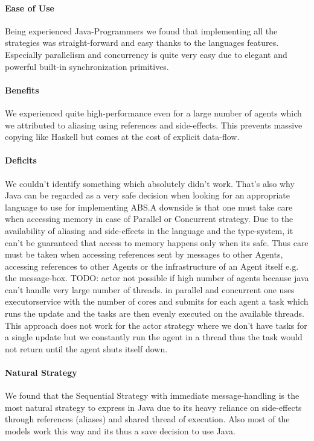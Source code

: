 \paragraph{Ease of Use}
Being experienced Java-Programmers we found that implementing all the strategies was straight-forward and easy thanks to the languages features. Especially parallelism and concurrency is quite very easy due to elegant and powerful built-in synchronization primitives.

\paragraph{Benefits}
We experienced quite high-performance even for a large number of agents which we attributed to aliasing using references and side-effects. This prevents massive copying like Haskell but comes at the cost of explicit data-flow.

\paragraph{Deficits}
We couldn't identify something which absolutely didn't work. That's also why Java can be regarded as a very safe decision when looking for an appropriate language to use for implementing ABS.A downside is that one must take care when accessing memory in case of Parallel or Concurrent strategy. Due to the availability of aliasing and side-effects in the language and the type-system, it can't be guaranteed that access to memory happens only when its safe. Thus care must be taken when accessing references sent by messages to other Agents, accessing references to other Agents or the infrastructure of an Agent itself e.g. the message-box. TODO: actor not possible if high number of agents because java can't handle very large number of threads. in parallel and concurrent one uses executorservice with the number of cores and submits for each agent a task which runs the update and the tasks are then evenly executed on the available threads. This approach does not work for the actor strategy where we don't have tasks for a single update but we constantly run the agent in a thread thus the task would not return until the agent shuts itself down. 

\paragraph{Natural Strategy}
We found that the Sequential Strategy with immediate message-handling is the most natural strategy to express in Java due to its heavy reliance on side-effects through references (aliases) and shared thread of execution. Also most of the models work this way and its thus a save decision to use Java.





